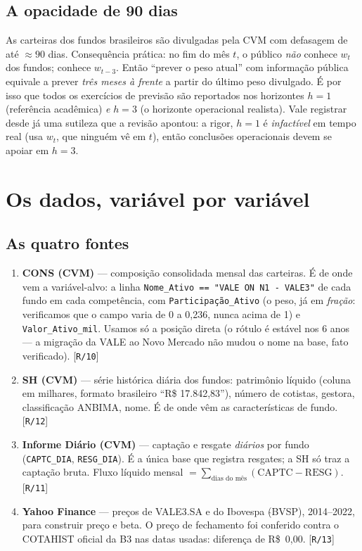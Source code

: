\documentclass[11pt,a4paper]{article}
\newcommand{\scriptref}[1]{{\footnotesize\color{cinza}[\texttt{#1}]}}
\begin{document}
\subsection{A opacidade de 90 dias}

As carteiras dos fundos brasileiros são divulgadas pela CVM com defasagem de até $\approx90$ dias.
Consequência prática: no fim do mês $t$, o público \emph{não} conhece $w_t$ dos fundos; conhece
$w_{t-3}$. Então ``prever o peso atual'' com informação pública equivale a prever \emph{três meses
à frente} a partir do último peso divulgado. É por isso que todos os exercícios de previsão são
reportados nos horizontes $h=1$ (referência acadêmica) \emph{e} $h=3$ (o horizonte operacional
realista). Vale registrar desde já uma sutileza que a revisão apontou: a rigor, $h=1$ é
\emph{infactível} em tempo real (usa $w_t$, que ninguém vê em $t$), então conclusões operacionais
devem se apoiar em $h=3$.

\section{Os dados, variável por variável}
\label{sec:dados}

\subsection{As quatro fontes}

\begin{enumerate}[topsep=2pt,itemsep=2pt]
\item \textbf{CONS (CVM)} --- composição consolidada mensal das carteiras. É de onde vem a
variável-alvo: a linha \texttt{Nome\_Ativo == "VALE ON N1 - VALE3"} de cada fundo em cada
competência, com \texttt{Participação\_Ativo} (o peso, já em \emph{fração}: verificamos que o
campo varia de 0 a 0{,}236, nunca acima de 1) e \texttt{Valor\_Ativo\_mil}. Usamos só a posição
direta (o rótulo é estável nos 6 anos --- a migração da VALE ao Novo Mercado não mudou o nome na
base, fato verificado). \scriptref{R/10}
\item \textbf{SH (CVM)} --- série histórica diária dos fundos: patrimônio líquido
(coluna em milhares, formato brasileiro ``R\$ 17.842,83''), número de cotistas,
gestora, classificação ANBIMA, nome. É de onde vêm as características de fundo. \scriptref{R/12}
\item \textbf{Informe Diário (CVM)} --- captação e resgate \emph{diários} por fundo
(\texttt{CAPTC\_DIA}, \texttt{RESG\_DIA}). É a única base que registra resgates; a SH só traz a
captação bruta. Fluxo líquido mensal $=\sum_{\text{dias do mês}}(\text{CAPTC}-\text{RESG})$.
\scriptref{R/11}
\item \textbf{Yahoo Finance} --- preços de VALE3.SA e do Ibovespa ($\hat{}$BVSP), 2014--2022, para
construir preço e beta. O preço de fechamento foi conferido contra o COTAHIST oficial da B3 nas
datas usadas: diferença de R\$~0{,}00. \scriptref{R/13}
\end{enumerate}
\end{document}
